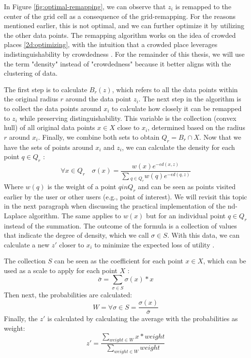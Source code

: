 In Figure \ref{fig:optimal-remapping}, we can observe that $z_i$ is remapped to the center of the grid cell as a consequence of the grid-remapping.
For the reasons mentioned earlier, this is not optimal, and we can further optimize it by utilizing the other data points.
The remapping algorithm works on the idea of crowded places \ref{2d:optimizing}, with the intuition that a crowded place leverages indistinguishability by crowdedness \citep{chatzikokolakis_efficient_2017}.
For the remainder of this thesis, we will use the term "density" instead of "crowdedness" because it better aligns with the clustering of data.

The first step is to calculate $B_r(z)$, which refers to all the data points within the original radius $r$ around the data point $z_i$.
The next step in the algorithm is to collect the data points around $x_i$ to calculate how closely it can be remapped to $z_i$ while preserving distinguishability.
This variable is the collection (convex hull) of all original data points $x \in X$ close to $x_i$, determined based on the radius $r$ around $x_i$.
Finally, we combine both sets to obtain $Q_r = B_r \cap X$.
Now that we have the sets of points around $x_i$ and $z_i$, we can calculate the density for each point $q \in Q_r$ \citep{chatzikokolakis_efficient_2017}:
\begin{equation}
  \forall x \in Q_r \quad \sigma(x) = \frac{w(x)e^{-\epsilon d(x, z)}}{\sum{_{q\in Q_r} w(q)e^{-\epsilon d(q, z)}}}
  \label{eq:optimal-remapping-formula-1}
\end{equation}
Where $w(q)$ is the weight of a point $q in Q_r$ and can be seen as points visited earlier by the user or other users (e.g., point of interest).
We will revisit this topic in the next paragraph when discussing the practical implementation of the nd-Laplace algorithm.
The same applies to $w(x)$ but for an individual point $q \in Q_r$ instead of the summation.
The outcome of the formula is a collection of values that indicate the degree of density, which we call $\sigma \in S$.
With this data, we can calculate a new $z'$ closer to $x_i$ to minimize the expected loss of utility \citep{chatzikokolakis_efficient_2017}.

The collection $S$ can be seen as the coefficient for each point $x \in X$, which can be used as a scale to apply for each point $X$ \citep{chatzikokolakis_efficient_2017}:
\begin{equation}
  \bar{\sigma} = \sum_{\sigma \in S} \sigma(x) * x
  \label{eq:optimal-remapping-formula-2}
\end{equation}
Then next, the probabilities are calculated:
\begin{equation}
  W = \forall \sigma \in S = \frac{\sigma(x)}{\bar{\sigma}}
  \label{eq:optimal-remapping-formula-3}
\end{equation}
Finally, the $z'$ is calculated by calculating the average with the probabilities as weight:
\begin{equation}
  z' = \frac{\sum_{weight \in W} x * weight }{\sum_{weight \in W} weight}
  \label{eq:optimal-remapping-formula-4}
\end{equation}

